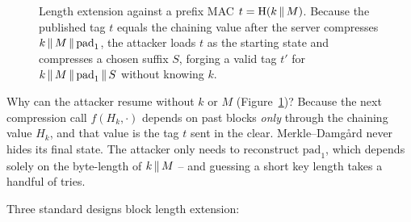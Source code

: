 \begin{figure}[htbp]
\caption{Length extension against a prefix MAC $t = \operatorname{H}(k \,\|\, M)$. Because the published tag $t$ equals the chaining value after the server compresses $k \,\|\, M \,\|\, \text{pad}_1$, the attacker loads $t$ as the starting state and compresses a chosen suffix $S$, forging a valid tag $t'$ for $k \,\|\, M \,\|\, \text{pad}_1 \,\|\, S$ without knowing $k$.}
\label{ch14:fig-lenext}
\end{figure}

\begin{walkbox}
Why can the attacker resume without $k$ or $M$ (Figure~\ref{ch14:fig-lenext})? Because the next compression call $f(H_k, \cdot)$ depends on past blocks \emph{only} through the chaining value $H_k$, and that value is the tag $t$ sent in the clear. Merkle--Damg\aa{}rd never hides its final state. The attacker only needs to reconstruct $\text{pad}_1$, which depends solely on the byte-length of $k \,\|\, M$ -- and guessing a short key length takes a handful of tries.
\end{walkbox}

Three standard designs block length extension:

